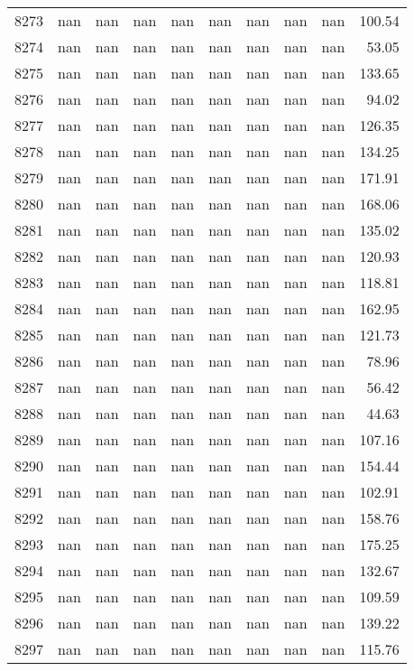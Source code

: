 \begin{tabular}{lrrrrrrrrr}
8273 & nan & nan & nan & nan & nan & nan & nan & nan & 100.54 \\
8274 & nan & nan & nan & nan & nan & nan & nan & nan & 53.05 \\
8275 & nan & nan & nan & nan & nan & nan & nan & nan & 133.65 \\
8276 & nan & nan & nan & nan & nan & nan & nan & nan & 94.02 \\
8277 & nan & nan & nan & nan & nan & nan & nan & nan & 126.35 \\
8278 & nan & nan & nan & nan & nan & nan & nan & nan & 134.25 \\
8279 & nan & nan & nan & nan & nan & nan & nan & nan & 171.91 \\
8280 & nan & nan & nan & nan & nan & nan & nan & nan & 168.06 \\
8281 & nan & nan & nan & nan & nan & nan & nan & nan & 135.02 \\
8282 & nan & nan & nan & nan & nan & nan & nan & nan & 120.93 \\
8283 & nan & nan & nan & nan & nan & nan & nan & nan & 118.81 \\
8284 & nan & nan & nan & nan & nan & nan & nan & nan & 162.95 \\
8285 & nan & nan & nan & nan & nan & nan & nan & nan & 121.73 \\
8286 & nan & nan & nan & nan & nan & nan & nan & nan & 78.96 \\
8287 & nan & nan & nan & nan & nan & nan & nan & nan & 56.42 \\
8288 & nan & nan & nan & nan & nan & nan & nan & nan & 44.63 \\
8289 & nan & nan & nan & nan & nan & nan & nan & nan & 107.16 \\
8290 & nan & nan & nan & nan & nan & nan & nan & nan & 154.44 \\
8291 & nan & nan & nan & nan & nan & nan & nan & nan & 102.91 \\
8292 & nan & nan & nan & nan & nan & nan & nan & nan & 158.76 \\
8293 & nan & nan & nan & nan & nan & nan & nan & nan & 175.25 \\
8294 & nan & nan & nan & nan & nan & nan & nan & nan & 132.67 \\
8295 & nan & nan & nan & nan & nan & nan & nan & nan & 109.59 \\
8296 & nan & nan & nan & nan & nan & nan & nan & nan & 139.22 \\
8297 & nan & nan & nan & nan & nan & nan & nan & nan & 115.76 \\

\end{tabular}
